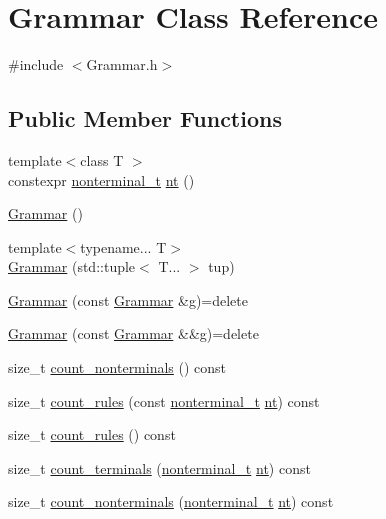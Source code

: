 \hypertarget{class_grammar}{}\section{Grammar Class Reference}
\label{class_grammar}


{\ttfamily \#include $<$Grammar.\+h$>$}

\subsection*{Public Member Functions}
\begin{DoxyCompactItemize}
\item 
{\footnotesize template$<$class T $>$ }\\constexpr \hyperlink{_nonterminal_8h_a5c1f658dc7560600a16d22408bd716ca}{nonterminal\+\_\+t} \hyperlink{class_grammar_aa5c9afa0e7e1aa989b54402b02a677a3}{nt} ()
\item 
\hyperlink{class_grammar_aa201250a002a7d07d398fee189a74427}{Grammar} ()
\item 
{\footnotesize template$<$typename... T$>$ }\\\hyperlink{class_grammar_a4e0a3b86d64eba75726b7355308c4649}{Grammar} (std\+::tuple$<$ T... $>$ tup)
\item 
\hyperlink{class_grammar_acfb7e4ea64210d03de896e300447e760}{Grammar} (const \hyperlink{class_grammar}{Grammar} \&g)=delete
\item 
\hyperlink{class_grammar_a28f97335602afe8b1a612679de2f80d9}{Grammar} (const \hyperlink{class_grammar}{Grammar} \&\&g)=delete
\item 
size\+\_\+t \hyperlink{class_grammar_abf841bc64ac19cb9872a8362f5e5731a}{count\+\_\+nonterminals} () const
\item 
size\+\_\+t \hyperlink{class_grammar_af25c47a2c5cae2a11720c8454e59290f}{count\+\_\+rules} (const \hyperlink{_nonterminal_8h_a5c1f658dc7560600a16d22408bd716ca}{nonterminal\+\_\+t} \hyperlink{class_grammar_aa5c9afa0e7e1aa989b54402b02a677a3}{nt}) const
\item 
size\+\_\+t \hyperlink{class_grammar_af8f0fdd9cb368a608bee5626774360d4}{count\+\_\+rules} () const
\item 
size\+\_\+t \hyperlink{class_grammar_a7cf0515f3ca761590da05455a417896b}{count\+\_\+terminals} (\hyperlink{_nonterminal_8h_a5c1f658dc7560600a16d22408bd716ca}{nonterminal\+\_\+t} \hyperlink{class_grammar_aa5c9afa0e7e1aa989b54402b02a677a3}{nt}) const
\item 
size\+\_\+t \hyperlink{class_grammar_a0714d68070749932d876fe868bde94bd}{count\+\_\+nonterminals} (\hyperlink{_nonterminal_8h_a5c1f658dc7560600a16d22408bd716ca}{nonterminal\+\_\+t} \hyperlink{class_grammar_aa5c9afa0e7e1aa989b54402b02a677a3}{nt}) const

\end{DoxyCompactItemize}
